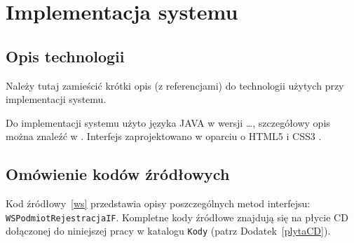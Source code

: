 \chapter{Implementacja systemu}
\thispagestyle{chapterBeginStyle}

\section{Opis technologii}

Należy tutaj zamieścić krótki opis (z referencjami) do technologii użytych przy implementacji systemu.

{\color{dgray}
Do implementacji systemu użyto języka JAVA w wersji \ldots, szczegółowy opis można znaleźć w \cite{PROLOG}. Interfejs zaprojektowano w oparciu o HTML5 i CSS3 \cite{HTML-CSS}.
}

\section{Omówienie kodów źródłowych}

{\color{dgray}
Kod źródłowy~\ref{ws} przedstawia opisy poszczególnych metod interfejsu: \texttt{WSPodmiotRejestracjaIF}. Kompletne
kody źródłowe znajdują się na płycie CD dołączonej do niniejszej pracy w katalogu \texttt{Kody} (patrz Dodatek~\ref{plytaCD}).
}

